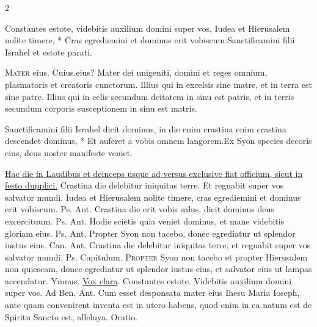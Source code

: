 \begin{multicols*}{2}
\begin{responsory}
{Constantes estote, videbitis auxilium domini super vos, Iudea et Hierusalem nolite timere, * Cras egrediemini et dominus erit vobiscum.}{Sanctificamini filii Israhel et estote parati.}
\end{responsory}%
\lettrine[lines=2]{\zallmancaps \color{Red} M}{ater} eius. Cuius.eius? Mater dei unigeniti, domini et reges omnium, plasmatoris et creatoris cunctorum. Illius qui in excelsis sine matre, et in terra est sine patre. Illius qui in celis secundum deitatem in sinu est patris, et in terris secundum corporis susceptionem in sinu est matris.
\begin{responsory-doxology}
{Sanctificamini filii Israhel dicit dominus, in die enim crastina enim crastina descendet dominus, * Et auferet a vobis omnem langorem.}{Ex Syon species decoris eius, deus noster manifeste veniet.}
\end{responsory-doxology}%
\newline \ul{Hac die in Laudibus et deinceps usque ad versus exclusive fiat officium, sicut in festo dupplici.}
\newline \V Crastina die delebitur iniquitas terre.
\newline \R Et regnabit super vos salvator mundi.
 Iudea et Hierusalem nolite timere, cras egrediemini et dominus erit vobiscum. {\color{Red} Ps.}  {\color{Red} Ant.} Crastina die erit vobis salus, dicit dominus deus excercituum. {\color{Red} Ps.}  {\color{Red} Ant.} Hodie scietis quia veniet dominus, et mane videbitis gloriam eius. {\color{Red} Ps.}  {\color{Red} Ant.} Propter Syon non tacebo, donec egrediatur ut splendor iustus eius. {\color{Red} Can.}  {\color{Red} Ant.} Crastina die delebitur iniquitas terre, et regnabit super vos salvator mundi. {\color{Red} Ps.}  {\color{Red} Capitulum.}
\lettrine[lines=2]{\zallmancaps \color{Blue} P}{ropter} Syon non tacebo et propter Hierusalem non quiescam, donec egrediatur ut splendor iustus eius, et salvator eius ut lampas accendatur. {\color{Red} Ymnus.} \hyperlink{vox-clara}{Vox clara}. \V Constantes estote. \R Videbitis auxilium domini super vos. {\color{Red} Ad Ben. Ant.} Cum esset desponsata mater eius Ihesu Maria Ioseph, ante quam convenirent inventa est in utero habens, quod enim in ea natum est de Spiritu Sancto est, alleluya. {\color{Red} Oratio.}

\end{multicols*}
